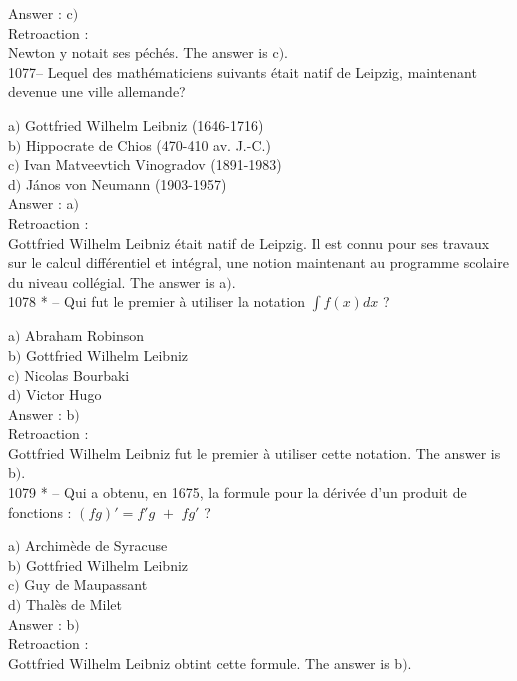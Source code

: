 ﻿\documentclass[letterpaper, 12pt]{article}
\begin{document}
Answer : c$)$\\

Retroaction : \\
Newton y notait ses p\'ech\'es.
The answer is c$)$.\\

1077-- Lequel des math\'ematiciens suivants \'etait natif de
Leipzig, maintenant devenue une ville allemande?

a$)$ Gottfried Wilhelm Leibniz (1646-1716) \\
b$)$ Hippocrate de Chios (470-410 av. J.-C.) \\
c$)$ Ivan Matveevtich Vinogradov (1891-1983) \\
d$)$ J\'anos von Neumann (1903-1957) \\

Answer : a$)$\\

Retroaction : \\
Gottfried Wilhelm Leibniz \'etait natif de Leipzig. Il est connu
pour ses travaux sur le calcul diff\'erentiel et int\'egral, une
notion maintenant au programme scolaire du niveau coll\'egial.
The answer is a$)$.\\

1078 * -- Qui fut le premier \`a utiliser la notation $\int f(x)dx$ ?

a$)$ Abraham Robinson \\
b$)$ Gottfried Wilhelm Leibniz \\
c$)$ Nicolas Bourbaki \\
d$)$ Victor Hugo\\

Answer : b$)$\\

Retroaction : \\
Gottfried Wilhelm Leibniz fut le premier \`a utiliser cette
notation.
The answer is b$)$.\\

1079 * -- Qui a obtenu, en 1675, la formule pour la d\'eriv\'ee d'un
produit de fonctions : $(fg)'=f'g\,\,+\,\,fg'$ ?

a$)$ Archim\`ede de Syracuse \\
b$)$ Gottfried Wilhelm Leibniz \\
c$)$ Guy de Maupassant \\
d$)$ Thal\`es de Milet\\

Answer : b$)$\\

Retroaction : \\
Gottfried Wilhelm Leibniz obtint cette formule.
The answer is b$)$.\\
\end{document}
